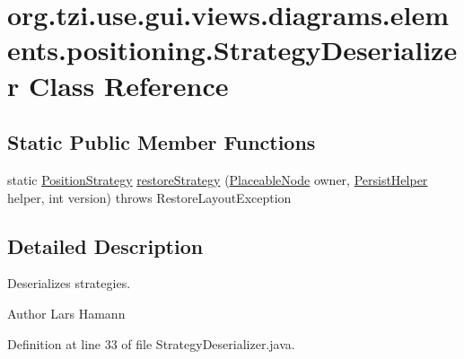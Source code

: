 \hypertarget{classorg_1_1tzi_1_1use_1_1gui_1_1views_1_1diagrams_1_1elements_1_1positioning_1_1_strategy_deserializer}{\section{org.\-tzi.\-use.\-gui.\-views.\-diagrams.\-elements.\-positioning.\-Strategy\-Deserializer Class Reference}
\label{classorg_1_1tzi_1_1use_1_1gui_1_1views_1_1diagrams_1_1elements_1_1positioning_1_1_strategy_deserializer}
}
\subsection*{Static Public Member Functions}
\begin{DoxyCompactItemize}
\item 
static \hyperlink{interfaceorg_1_1tzi_1_1use_1_1gui_1_1views_1_1diagrams_1_1elements_1_1positioning_1_1_position_strategy}{Position\-Strategy} \hyperlink{classorg_1_1tzi_1_1use_1_1gui_1_1views_1_1diagrams_1_1elements_1_1positioning_1_1_strategy_deserializer_afc67b02d47e6a9e42c428968e22c5922}{restore\-Strategy} (\hyperlink{classorg_1_1tzi_1_1use_1_1gui_1_1views_1_1diagrams_1_1elements_1_1_placeable_node}{Placeable\-Node} owner, \hyperlink{classorg_1_1tzi_1_1use_1_1gui_1_1util_1_1_persist_helper}{Persist\-Helper} helper, int version)  throws Restore\-Layout\-Exception 
\end{DoxyCompactItemize}


\subsection{Detailed Description}
Deserializes strategies. \begin{DoxyAuthor}{Author}
Lars Hamann 
\end{DoxyAuthor}


Definition at line 33 of file Strategy\-Deserializer.\-java.



